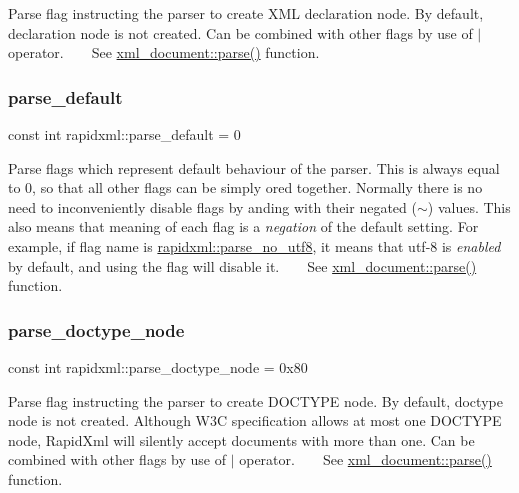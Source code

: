 Parse flag instructing the parser to create X\+ML declaration node. By default, declaration node is not created. Can be combined with other flags by use of $\vert$ operator. ~\newline
~\newline
 See \mbox{\hyperlink{classrapidxml_1_1xml__document_ac6e73ff9ac323bf5a370c38feb03a6b1}{xml\+\_\+document\+::parse()}} function. \mbox{\label{namespacerapidxml_acf4edf952f59eb1b6124ea37ad7da3ab}} 
\subsubsection{\texorpdfstring{parse\+\_\+default}{parse\_default}}
{\footnotesize\ttfamily const int rapidxml\+::parse\+\_\+default = 0}

Parse flags which represent default behaviour of the parser. This is always equal to 0, so that all other flags can be simply ored together. Normally there is no need to inconveniently disable flags by anding with their negated ($\sim$) values. This also means that meaning of each flag is a {\itshape negation} of the default setting. For example, if flag name is \mbox{\hyperlink{namespacerapidxml_a22d4aefaceb00d7afabfef7107b108da}{rapidxml\+::parse\+\_\+no\+\_\+utf8}}, it means that utf-\/8 is {\itshape enabled} by default, and using the flag will disable it. ~\newline
~\newline
 See \mbox{\hyperlink{classrapidxml_1_1xml__document_ac6e73ff9ac323bf5a370c38feb03a6b1}{xml\+\_\+document\+::parse()}} function. \mbox{\label{namespacerapidxml_a41002b49780a90a0bbcc28ce8b895fe4}} 
\subsubsection{\texorpdfstring{parse\+\_\+doctype\+\_\+node}{parse\_doctype\_node}}
{\footnotesize\ttfamily const int rapidxml\+::parse\+\_\+doctype\+\_\+node = 0x80}

Parse flag instructing the parser to create D\+O\+C\+T\+Y\+PE node. By default, doctype node is not created. Although W3C specification allows at most one D\+O\+C\+T\+Y\+PE node, Rapid\+Xml will silently accept documents with more than one. Can be combined with other flags by use of $\vert$ operator. ~\newline
~\newline
 See \mbox{\hyperlink{classrapidxml_1_1xml__document_ac6e73ff9ac323bf5a370c38feb03a6b1}{xml\+\_\+document\+::parse()}} function. \mbox{\label{namespacerapidxml_a64da06dfdab7c86ca954bda4fecb978f}} 
